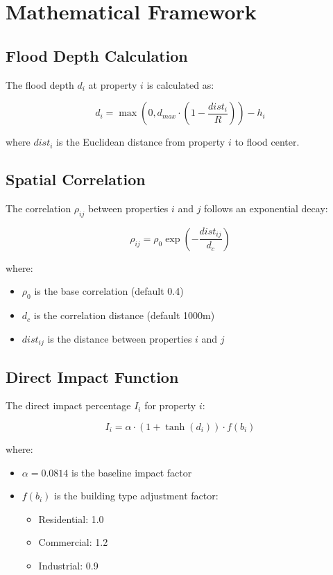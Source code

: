 \documentclass{article}
\begin{document}
\section{Mathematical Framework}

\subsection{Flood Depth Calculation}
The flood depth $d_i$ at property $i$ is calculated as:

\begin{equation}
d_i = \max(0, d_{max} \cdot (1 - \frac{dist_i}{R})) - h_i
\end{equation}

where $dist_i$ is the Euclidean distance from property $i$ to flood center.

\subsection{Spatial Correlation}
The correlation $\rho_{ij}$ between properties $i$ and $j$ follows an exponential decay:

\begin{equation}
\rho_{ij} = \rho_0 \exp(-\frac{dist_{ij}}{d_c})
\end{equation}

where:
\begin{itemize}
    \item $\rho_0$ is the base correlation (default 0.4)
    \item $d_c$ is the correlation distance (default 1000m)
    \item $dist_{ij}$ is the distance between properties $i$ and $j$
\end{itemize}

\subsection{Direct Impact Function}
The direct impact percentage $I_i$ for property $i$:

\begin{equation}
I_i = \alpha \cdot (1 + \tanh(d_i)) \cdot f(b_i)
\end{equation}

where:
\begin{itemize}
    \item $\alpha = 0.0814$ is the baseline impact factor
    \item $f(b_i)$ is the building type adjustment factor:
    \begin{itemize}
        \item Residential: 1.0
        \item Commercial: 1.2
        \item Industrial: 0.9
    \end{itemize}
\end{itemize}
\end{document}
